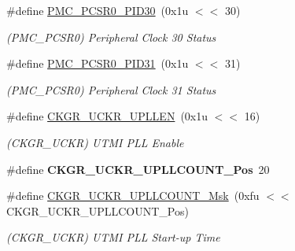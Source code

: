 \begin{DoxyCompactItemize}
\mbox{\label{group__SAMS70__PMC_ga9fab50748c6e80609be228b4a39a7486}} 
\#define \mbox{\hyperlink{group__SAMS70__PMC_ga9fab50748c6e80609be228b4a39a7486}{P\+M\+C\+\_\+\+P\+C\+S\+R0\+\_\+\+P\+I\+D30}}~(0x1u $<$$<$ 30)
\begin{DoxyCompactList}\small\item\em (P\+M\+C\+\_\+\+P\+C\+S\+R0) Peripheral Clock 30 Status \end{DoxyCompactList}\item 
\mbox{\label{group__SAMS70__PMC_ga737a1566079f4040ca78725ec7a8c660}} 
\#define \mbox{\hyperlink{group__SAMS70__PMC_ga737a1566079f4040ca78725ec7a8c660}{P\+M\+C\+\_\+\+P\+C\+S\+R0\+\_\+\+P\+I\+D31}}~(0x1u $<$$<$ 31)
\begin{DoxyCompactList}\small\item\em (P\+M\+C\+\_\+\+P\+C\+S\+R0) Peripheral Clock 31 Status \end{DoxyCompactList}\item 
\mbox{\label{group__SAMS70__PMC_gac7013a00c3320706c12c78df0f4ff60b}} 
\#define \mbox{\hyperlink{group__SAMS70__PMC_gac7013a00c3320706c12c78df0f4ff60b}{C\+K\+G\+R\+\_\+\+U\+C\+K\+R\+\_\+\+U\+P\+L\+L\+EN}}~(0x1u $<$$<$ 16)
\begin{DoxyCompactList}\small\item\em (C\+K\+G\+R\+\_\+\+U\+C\+KR) U\+T\+MI P\+LL Enable \end{DoxyCompactList}\item 
\mbox{\label{group__SAMS70__PMC_ga1180ec278f43f0996eed363aa2a045f3}} 
\#define {\bfseries C\+K\+G\+R\+\_\+\+U\+C\+K\+R\+\_\+\+U\+P\+L\+L\+C\+O\+U\+N\+T\+\_\+\+Pos}~20
\item 
\mbox{\label{group__SAMS70__PMC_ga61f75d9c80b8106bfab1d3a066decf1f}} 
\#define \mbox{\hyperlink{group__SAMS70__PMC_ga61f75d9c80b8106bfab1d3a066decf1f}{C\+K\+G\+R\+\_\+\+U\+C\+K\+R\+\_\+\+U\+P\+L\+L\+C\+O\+U\+N\+T\+\_\+\+Msk}}~(0xfu $<$$<$ C\+K\+G\+R\+\_\+\+U\+C\+K\+R\+\_\+\+U\+P\+L\+L\+C\+O\+U\+N\+T\+\_\+\+Pos)
\begin{DoxyCompactList}\small\item\em (C\+K\+G\+R\+\_\+\+U\+C\+KR) U\+T\+MI P\+LL Start-\/up Time \end{DoxyCompactList}\item 

\end{DoxyCompactItemize}
